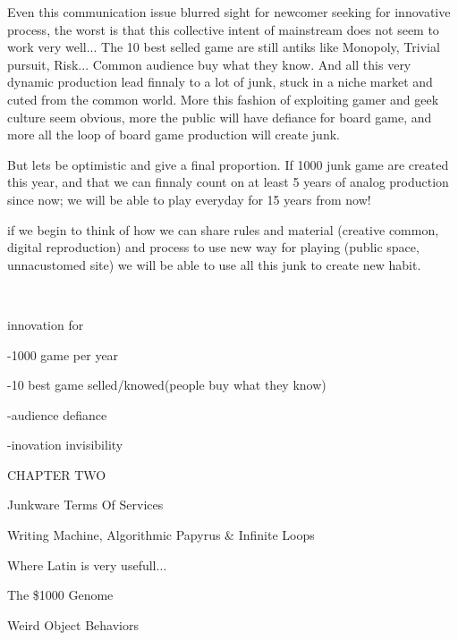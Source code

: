 Even this communication issue blurred sight for newcomer seeking for
innovative process, the worst is that this collective intent of
mainstream does not seem to work very well... The 10 best selled game
are still antiks like Monopoly, Trivial pursuit, Risk... Common
audience buy what they know. And all this very dynamic production lead
finnaly to a lot of junk, stuck in a niche market and cuted from the
common world. More this fashion of exploiting gamer and geek culture
seem obvious, more the public will have defiance for board game, and
more all the loop of board game production will create junk.

But let{\textquotesingle}s be optimistic and give a final proportion. If
1000 junk game are created this year, and that we can finnaly count on
at least 5 years of analog production since now; we will be able to
play everyday for 15 years from now!

if we begin to think of how we can share rules and material (creative
common, digital reproduction) and process to use new way for playing
(public space, unnacustomed site) we will be able to use all this junk
to create new habit. ~ ~

~

innovation for ~ ~ ~ ~ ~ ~~

{}-1000 game per year

{}-10 best game selled/knowed(people buy what they know)

{}-audience defiance

{}-inovation invisibility



\bigskip




\bigskip


CHAPTER TWO

 Junkware Terms Of Services

 Writing Machine, Algorithmic Papyrus \&
Infinite Loops

 Where Latin is very usefull...

 The \$1000 Genome

 Weird Object Behaviors

